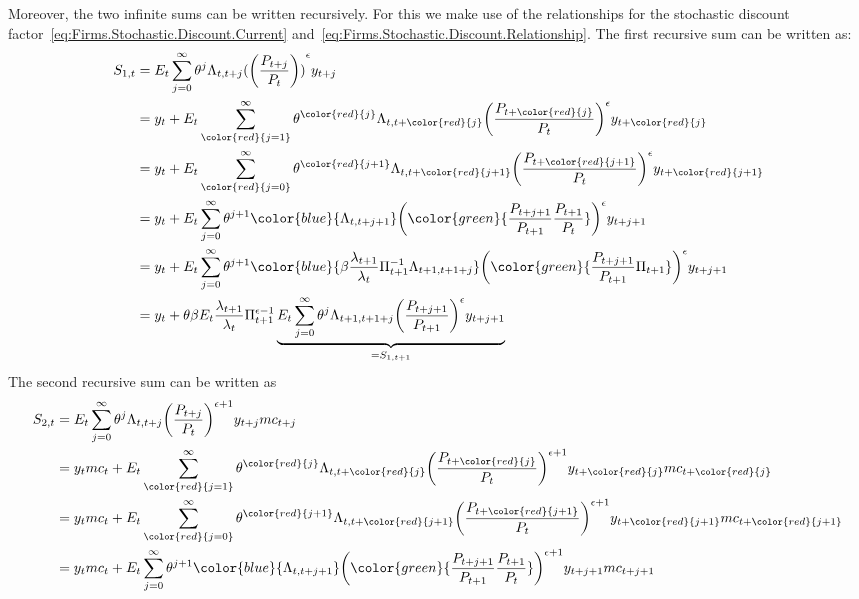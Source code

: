 \begin{enumerate}
Moreover, the two infinite sums can be written recursively.
For this we make use of the relationships for the stochastic discount factor~\eqref{eq:Firms.Stochastic.Discount.Current} and~\eqref{eq:Firms.Stochastic.Discount.Relationship}.
The first recursive sum can be written as:
\begin{align*}
	S_{1,t} &= 
	E_t\sum_{j=0}^{\infty}\theta^j \Lambda_{t,t+j} {(\left(\frac{P_{t+j}}{P_t}\right))}^{\epsilon} y_{t+j}
	\\
	&= y_t + E_t\sum^{\infty}_{\color{red}{j=1}}\theta^{\color{red}{j}} \Lambda_{t,t+\color{red}{j}} {\left(\frac{P_{t+\color{red}{j}}}{P_t}\right)}^{\epsilon} y_{t+\color{red}{j}}
	\\
	&= y_t + E_t\sum^{\infty}_{\color{red}{j=0}}\theta^{\color{red}{j+1}} \Lambda_{t,t+\color{red}{j+1}} {\left(\frac{P_{t+\color{red}{j+1}}}{P_t}\right)}^{\epsilon} y_{t+\color{red}{j+1}}
	\\
	&= y_t + E_t\sum^{\infty}_{j=0}\theta^{j+1} {\color{blue}{\Lambda_{t,t+j+1}}} {\left({\color{green}{\frac{P_{t+j+1}}{P_{t+1}}\frac{P_{t+1}}{P_{t}}}}\right)}^{\epsilon} y_{t+j+1}
	\\
	&= y_t + E_t\sum^{\infty}_{j=0}\theta^{j+1} {\color{blue}{\beta \frac{\lambda_{t+1}}{\lambda_t}\Pi_{t+1}^{-1} \Lambda_{t+1,t+1+j}}} {\left({\color{green}{\frac{P_{t+j+1}}{P_{t+1}}\Pi_{t+1}}}\right)}^{\epsilon} y_{t+j+1}
	\\
	&= y_t + \theta\beta E_t\frac{\lambda_{t+1}}{\lambda_t}\Pi_{t+1}^{\epsilon-1} \underbrace{E_t\sum^{\infty}_{j=0}\theta^{j} \Lambda_{t+1,t+1+j} {\left(\frac{P_{t+j+1}}{P_{t+1}}\right)}^{\epsilon} y_{t+j+1}}_{=S_{1,t+1}}
\end{align*}
The second recursive sum can be written as
\begin{align*}
	S_{2,t} &= 
	E_t\sum_{j=0}^{\infty}\theta^j \Lambda_{t,t+j} {\left(\frac{P_{t+j}}{P_t}\right)}^{\epsilon+1} y_{t+j} mc_{t+j}
	\\
	&= y_t mc_t + E_t\sum^{\infty}_{\color{red}{j=1}}\theta^{\color{red}{j}} \Lambda_{t,t+\color{red}{j}} {\left(\frac{P_{t+\color{red}{j}}}{P_t}\right)}^{\epsilon+1} y_{t+\color{red}{j}} mc_{t+\color{red}{j}}
	\\
	&= y_t mc_t + E_t\sum^{\infty}_{\color{red}{j=0}}\theta^{\color{red}{j+1}} \Lambda_{t,t+\color{red}{j+1}} {\left(\frac{P_{t+\color{red}{j+1}}}{P_t}\right)}^{\epsilon+1} y_{t+\color{red}{j+1}} mc_{t+\color{red}{j+1}}
	\\
	&= y_t mc_t + E_t\sum^{\infty}_{j=0}\theta^{j+1} {\color{blue}{\Lambda_{t,t+j+1}}} {\left({\color{green}{\frac{P_{t+j+1}}{P_{t+1}}\frac{P_{t+1}}{P_{t}}}}\right)}^{\epsilon+1} y_{t+j+1} mc_{t+j+1}

\end{align*}
\end{enumerate}
